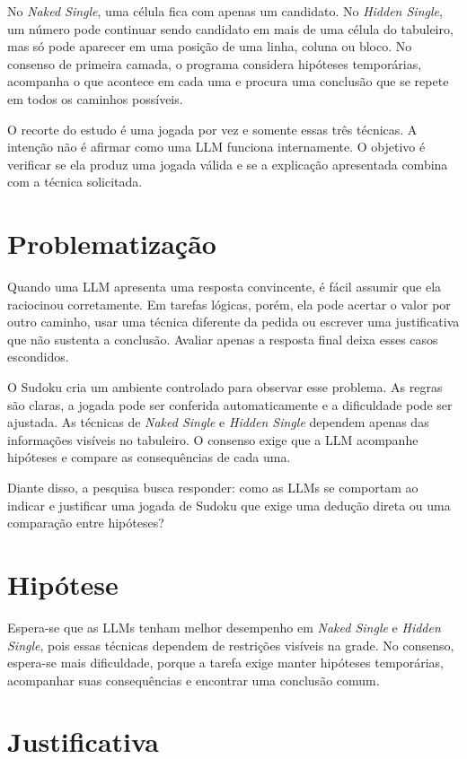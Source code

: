 No \textit{Naked Single}, uma célula fica com apenas um candidato. No \textit{Hidden Single}, um número pode continuar sendo candidato em mais de uma célula do tabuleiro, mas só pode aparecer em uma posição de uma linha, coluna ou bloco. No consenso de primeira camada, o programa considera hipóteses temporárias, acompanha o que acontece em cada uma e procura uma conclusão que se repete em todos os caminhos possíveis.

O recorte do estudo é uma jogada por vez e somente essas três técnicas. A intenção não é afirmar como uma LLM funciona internamente. O objetivo é verificar se ela produz uma jogada válida e se a explicação apresentada combina com a técnica solicitada.

\section{Problematização}

Quando uma LLM apresenta uma resposta convincente, é fácil assumir que ela raciocinou corretamente. Em tarefas lógicas, porém, ela pode acertar o valor por outro caminho, usar uma técnica diferente da pedida ou escrever uma justificativa que não sustenta a conclusão. Avaliar apenas a resposta final deixa esses casos escondidos.

O Sudoku cria um ambiente controlado para observar esse problema. As regras são claras, a jogada pode ser conferida automaticamente e a dificuldade pode ser ajustada. As técnicas de \textit{Naked Single} e \textit{Hidden Single} dependem apenas das informações visíveis no tabuleiro. O consenso exige que a LLM acompanhe hipóteses e compare as consequências de cada uma.

Diante disso, a pesquisa busca responder: como as LLMs se comportam ao indicar e justificar uma jogada de Sudoku que exige uma dedução direta ou uma comparação entre hipóteses?

\section{Hipótese}

Espera-se que as LLMs tenham melhor desempenho em \textit{Naked Single} e \textit{Hidden Single}, pois essas técnicas dependem de restrições visíveis na grade. No consenso, espera-se mais dificuldade, porque a tarefa exige manter hipóteses temporárias, acompanhar suas consequências e encontrar uma conclusão comum.

\section{Justificativa}

